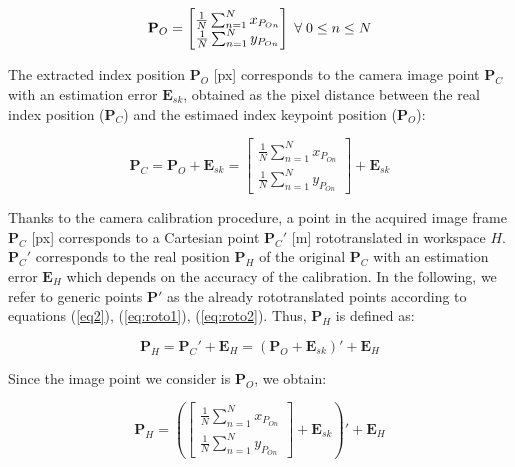 \documentclass[a4paper, 10 pt, conference]{ieeeconf}      %
\begin{document}
\begin{equation}
\mathbf{P}_O = \begin{bmatrix}
\frac{1}{N}\sum_{n=1}^{N}x_{P_{On}} \\
\frac{1}{N}\sum_{n=1}^{N}y_{P_{On}}
\end{bmatrix}
\thickspace \forall\thickspace 0 \leq n \leq N
\end{equation}

The extracted index position $\mathbf{P}_O$ [px] corresponds to the camera image point $\mathbf{P}_C$ with an estimation error $\mathbf{E}_{sk}$, obtained as the pixel distance between the real index position ($\mathbf{P}_C$) and the estimaed index keypoint position ($\mathbf{P}_O$):

\begin{equation}
\mathbf{P}_C = \mathbf{P}_O + \mathbf{E}_{sk} = \begin{bmatrix}
\frac{1}{N}\sum_{n=1}^{N}x_{P_{On}} \\
\frac{1}{N}\sum_{n=1}^{N}y_{P_{On}}
\end{bmatrix} + \mathbf{E}_{sk}
\end{equation}

Thanks to the camera calibration procedure, a point in the acquired image frame $\mathbf{P}_C$ [px] corresponds to a Cartesian point $\mathbf{P}_C'$ [m] rototranslated in workspace $H$. $\mathbf{P}_C'$ corresponds to the real position $\mathbf{P}_H$ of the original $\mathbf{P}_C$ with an estimation error $\mathbf{E}_H$ which depends on the accuracy of the calibration. In the following, we refer to generic points $\mathbf{P}'$ as the already rototranslated points according to equations (\ref{eq2}), (\ref{eq:roto1}), (\ref{eq:roto2}). Thus, $\mathbf{P}_H$ is defined as:

\begin{equation}
\mathbf{P}_H = \mathbf{P}_C' + \mathbf{E}_H = (\mathbf{P}_O + \mathbf{E}_{sk})' + \mathbf{E}_H
\end{equation}

Since the image point we consider is $\mathbf{P}_O$, we obtain: 

\begin{equation}
\mathbf{P}_H = \left(\begin{bmatrix}
\frac{1}{N}\sum_{n=1}^{N}x_{P_{On}} \\
\frac{1}{N}\sum_{n=1}^{N}y_{P_{On}}
\end{bmatrix} + \mathbf{E}_{sk} \right)' + \mathbf{E}_H
\end{equation}
\end{document}
